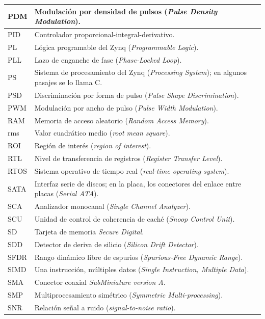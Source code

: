 {\begin{longtable}{|>{\raggedright\arraybackslash}p{}%
  |>{\raggedright\arraybackslash}p{}|}
PDM & Modulación por densidad de pulsos (\emph{Pulse Density Modulation}). \\ \hline
PID & Controlador proporcional-integral-derivativo. \\ \hline
PL & Lógica programable del Zynq (\emph{Programmable Logic}). \\ \hline
PLL & Lazo de enganche de fase (\emph{Phase-Locked Loop}). \\ \hline
PS & Sistema de procesamiento del Zynq (\emph{Processing System}); en algunos pasajes se lo llama \textmu{}C. \\ \hline
PSD & Discriminación por forma de pulso (\emph{Pulse Shape Discrimination}). \\ \hline
PWM & Modulación por ancho de pulso (\emph{Pulse Width Modulation}). \\ \hline
RAM & Memoria de acceso aleatorio (\emph{Random Access Memory}). \\ \hline
rms & Valor cuadrático medio (\emph{root mean square}). \\ \hline
ROI & Región de interés (\emph{region of interest}). \\ \hline
RTL & Nivel de transferencia de registros (\emph{Register Transfer Level}). \\ \hline
RTOS & Sistema operativo de tiempo real (\emph{real-time operating system}). \\ \hline
SATA & Interfaz serie de discos; en la placa, los conectores del enlace entre placas (\emph{Serial ATA}). \\ \hline
SCA & Analizador monocanal (\emph{Single Channel Analyzer}). \\ \hline
SCU & Unidad de control de coherencia de caché (\emph{Snoop Control Unit}). \\ \hline
SD & Tarjeta de memoria \emph{Secure Digital}. \\ \hline
SDD & Detector de deriva de silicio (\emph{Silicon Drift Detector}). \\ \hline
SFDR & Rango dinámico libre de espurios (\emph{Spurious-Free Dynamic Range}). \\ \hline
SIMD & Una instrucción, múltiples datos (\emph{Single Instruction, Multiple Data}). \\ \hline
SMA & Conector coaxial \emph{SubMiniature version A}. \\ \hline
SMP & Multiprocesamiento simétrico (\emph{Symmetric Multi-processing}). \\ \hline
SNR & Relación señal a ruido (\emph{signal-to-noise ratio}). \\ \hline

\end{longtable}}

